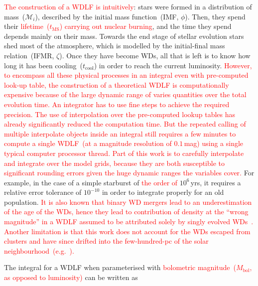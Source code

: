 \documentclass[fleqn,usenatbib]{rasti}
\begin{document}
\textcolor{red}{The construction of a WDLF is intuitively}: stars were formed in
a distribution of mass~($\mathcal{M}_i$), described by the initial mass
function~(IMF, $\phi$). Then, they spend their \textcolor{red}{
lifetime~($t_{\mathrm{MS}}$) carrying out nuclear burning}, and the time they
spend depends mainly on their mass. Towards the end stage of stellar evolution
stars shed most of the atmosphere, which is modelled by the initial-final mass
relation~(IFMR, $\zeta$). Once they have become WDs, all that is left is to
know how long it has been cooling~($t_{\mathrm{cool}}$) in order to reach the
current luminosity. \textcolor{red}{However, to encompass all these physical
processes in an integral even with pre-computed look-up table, the construction
of a theoretical WDLF is computationally expensive because of the large dynamic
range of varies quantities over the total evolution time. An integrator has to
use fine steps to achieve the required precision. The use of interpolation over
the pre-computed lookup tables has already significantly reduced the computation
time. But the repeated calling of multiple interpolate objects inside an
integral still requires a few minutes to compute a single WDLF~(at a magnitude
resolution of $0.1$\,mag) using a single typical computer processor thread.
Part of this work is to carefully interpolate and integrate over the model
grids, because they are both susceptible to significant rounding errors given
the huge dynamic ranges the variables cover.} For example, in the case of a
simple starburst of \textcolor{red}{the order of }$10^6$\,yrs, it requires a
relative error tolerance of $10^{-10}$ in order to integrate properly for an
old population. \textcolor{red}{It is also known that binary WD mergers lead to
an underestimation of the age of the WDs, hence they lead to contribution of
density at the ``wrong magnitude'' in a WDLF assumed to be attributed solely
by singly evolved WDs~\citep{2020A&A...636A..31T}. Another limitation is that
this work does not account for the WDs escaped from clusters and have since
drifted into the few-hundred-pc of the solar neighbourhood~(e.g.\
\citealt{2013ApJ...770..140Z,2022ApJ...926..132H, 2022ApJ...926L..24M}).}

The integral for a WDLF when parameterised with \textcolor{red}{bolometric
magnitude~($M_\mathrm{bol}$, as opposed to luminosity)} can be written as
\end{document}
